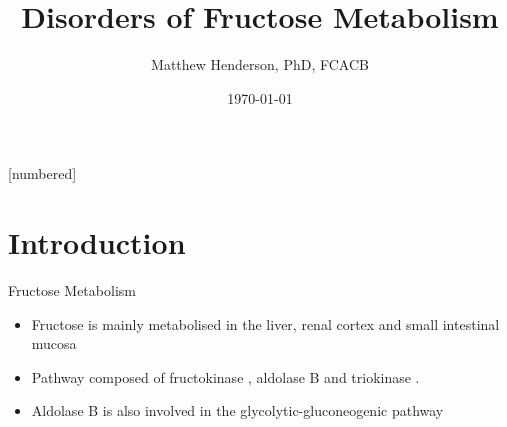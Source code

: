 \documentclass[presentation, smaller]{beamer}
\author{Matthew Henderson, PhD, FCACB}
\date{\today}
\title{Disorders of Fructose Metabolism}
\institute[NSO]{Newborn Screening Ontario | The University of Ottawa}
\begin{document}
\maketitle


\vspace{220pt}
\beamertemplatenavigationsymbolsempty
{}[numbered]

\section{Introduction}
\label{sec:org5750aa4}
\begin{frame}[label={sec:orgda1e948}]{Fructose Metabolism}
\begin{itemize}
\item Fructose is mainly metabolised in the liver, renal cortex and small intestinal mucosa
\item Pathway composed of fructokinase , aldolase B and triokinase .
\item Aldolase B is also involved in the glycolytic-gluconeogenic pathway
\end{itemize}
\end{frame}
\end{document}
